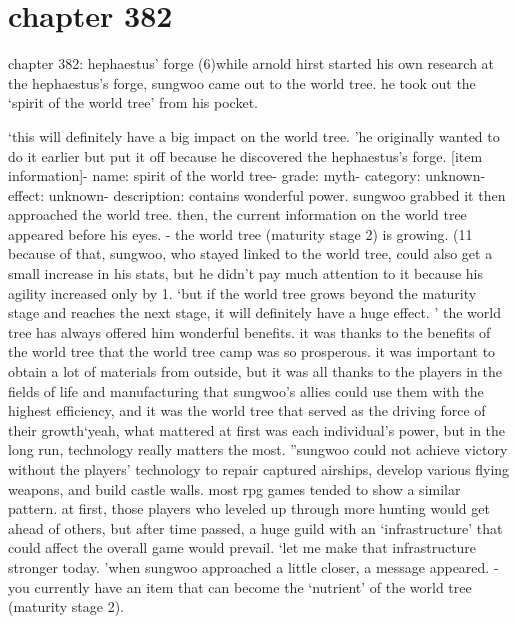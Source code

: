 \section{chapter 382}

chapter 382: hephaestus’ forge (6)while arnold hirst started his own research at the hephaestus’s forge, sungwoo came out to the world tree.
 he took out the ‘spirit of the world tree’ from his pocket.





‘this will definitely have a big impact on the world tree.
’he originally wanted to do it earlier but put it off because he discovered the hephaestus’s forge.
[item information]- name: spirit of the world tree- grade: myth- category: unknown- effect: unknown- description: contains wonderful power.
sungwoo grabbed it then approached the world tree.
 then, the current information on the world tree appeared before his eyes.
- the world tree (maturity stage 2) is growing.
 (11%
because of that, sungwoo, who stayed linked to the world tree, could also get a small increase in his stats, but he didn’t pay much attention to it because his agility increased only by 1.
‘but if the world tree grows beyond the maturity stage and reaches the next stage, it will definitely have a huge effect.
’
the world tree has always offered him wonderful benefits.
 it was thanks to the benefits of the world tree that the world tree camp was so prosperous.
it was important to obtain a lot of materials from outside, but it was all thanks to the players in the fields of life and manufacturing that sungwoo’s allies could use them with the highest efficiency, and it was the world tree that served as the driving force of their growth‘yeah, what mattered at first was each individual’s power, but in the long run, technology really matters the most.
”sungwoo could not achieve victory without the players’ technology to repair captured airships, develop various flying weapons, and build castle walls.
most rpg games tended to show a similar pattern.
 at first, those players who leveled up through more hunting would get ahead of others, but after time passed, a huge guild with an ‘infrastructure’ that could affect the overall game would prevail.
‘let me make that infrastructure stronger today.
’when sungwoo approached a little closer, a message appeared.
- you currently have an item that can become the ‘nutrient’ of the world tree (maturity stage 2).
